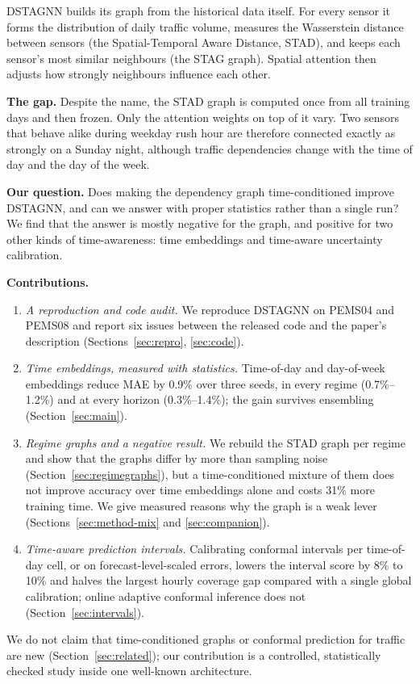 \documentclass[conference]{IEEEtran}
\begin{document}
DSTAGNN \cite{lan2022dstagnn} builds its graph from the historical data itself. For every sensor it forms the distribution of daily traffic volume, measures the Wasserstein distance between sensors (the Spatial-Temporal Aware Distance, STAD), and keeps each sensor's most similar neighbours (the STAG graph). Spatial attention then adjusts how strongly neighbours influence each other.

\textbf{The gap.} Despite the name, the STAD graph is computed once from all training days and then frozen. Only the attention weights on top of it vary. Two sensors that behave alike during weekday rush hour are therefore connected exactly as strongly on a Sunday night, although traffic dependencies change with the time of day and the day of the week.

\textbf{Our question.} Does making the dependency graph time-conditioned improve DSTAGNN, and can we answer with proper statistics rather than a single run? We find that the answer is mostly negative for the graph, and positive for two other kinds of time-awareness: time embeddings and time-aware uncertainty calibration.

\textbf{Contributions.}
\begin{enumerate}
\item \emph{A reproduction and code audit.} We reproduce DSTAGNN on PEMS04 and PEMS08 and report six issues between the released code and the paper's description (Sections~\ref{sec:repro}, \ref{sec:code}).
\item \emph{Time embeddings, measured with statistics.} Time-of-day and day-of-week embeddings reduce MAE by 0.9\% over three seeds, in every regime (0.7\%--1.2\%) and at every horizon (0.3\%--1.4\%); the gain survives ensembling (Section~\ref{sec:main}).
\item \emph{Regime graphs and a negative result.} We rebuild the STAD graph per regime and show that the graphs differ by more than sampling noise (Section~\ref{sec:regimegraphs}), but a time-conditioned mixture of them does not improve accuracy over time embeddings alone and costs 31\% more training time. We give measured reasons why the graph is a weak lever (Sections~\ref{sec:method-mix} and \ref{sec:companion}).
\item \emph{Time-aware prediction intervals.} Calibrating conformal intervals per time-of-day cell, or on forecast-level-scaled errors, lowers the interval score by 8\% to 10\% and halves the largest hourly coverage gap compared with a single global calibration; online adaptive conformal inference does not (Section~\ref{sec:intervals}).
\end{enumerate}
We do not claim that time-conditioned graphs or conformal prediction for traffic are new (Section~\ref{sec:related}); our contribution is a controlled, statistically checked study inside one well-known architecture.
\end{document}
